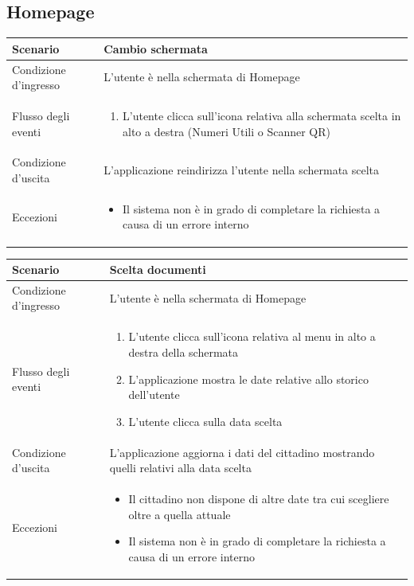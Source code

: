 \documentclass[12pt,a4paper,twoside,openright,titlepage]{book}
\begin{document}
\subsection{Homepage}
\begin{table}[H]
\centering
\begin{tabular}{|p{4cm}|p{10cm}|}
\hline
Scenario & Cambio schermata \\
\hline
Condizione d'ingresso & L'utente è nella schermata di Homepage\\
\hline
Flusso degli eventi & 
\begin{enumerate}
\item L'utente clicca sull'icona relativa alla schermata scelta in alto a destra (Numeri Utili o Scanner QR)
\end{enumerate}\\
\hline
Condizione d'uscita & L'applicazione reindirizza l'utente nella schermata scelta
\\
\hline
Eccezioni & 
\begin{itemize}
\item Il sistema non è in grado di completare la richiesta a causa di un errore interno
\end{itemize} \\
\hline
\end{tabular}
\end{table}

\begin{table}[H]
\centering
\begin{tabular}{|p{4cm}|p{10cm}|}
\hline
Scenario & Scelta documenti \\
\hline
Condizione d'ingresso & L'utente è nella schermata di Homepage\\
\hline
Flusso degli eventi & 
\begin{enumerate}
\item L'utente clicca sull'icona relativa al menu in alto a destra della schermata
\item L'applicazione mostra le date relative allo storico dell'utente
\item L'utente clicca sulla data scelta
\end{enumerate}\\
\hline
Condizione d'uscita & L'applicazione aggiorna i dati del cittadino mostrando quelli relativi alla data scelta
\\
\hline
Eccezioni & 
\begin{itemize}
\item Il cittadino non dispone di altre date tra cui scegliere oltre a quella attuale
\item Il sistema non è in grado di completare la richiesta a causa di un errore interno
\end{itemize} \\
\hline
\end{tabular}
\end{table}
\end{document}
